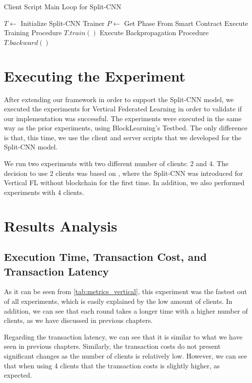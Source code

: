 \begin{algorithm}
\caption{Client Script Main Loop for Split-CNN}\label{alg:client_loop_splitcnn}
\begin{algorithmic}
\State $T \gets $ Initialize Split-CNN Trainer
    \State $P \gets$ Get Phase From Smart Contract
        \State Execute Training Procedure $T.train()$
        \State Execute Backpropagation Procedure $T.backward()$
    \EndIf
\EndWhile
\end{algorithmic}
\end{algorithm}

\section{Executing the Experiment}

After extending our framework in order to support the Split-CNN model, we executed the experiments for Vertical Federated Learning in order to validate if our implementation was successful. The experiments were executed in the same way as the prior experiments, using BlockLearning's Testbed. The only difference is that, this time, we use the client and server scripts that we developed for the Split-CNN model.

We run two experiments with two different number of clients: 2 and 4. The decision to use 2 clients was based on \cite{10.1145/3297858.3304038}, where the Split-CNN was introduced for Vertical FL without blockchain for the first time. In addition, we also performed experiments with 4 clients.

\section{Results Analysis}

\subsection{Execution Time, Transaction Cost, and Transaction Latency}

As it can be seen from \autoref{tab:metrics_vertical}, this experiment was the fastest out of all experiments, which is easily explained by the low amount of clients. In addition, we can see that each round takes a longer time with a higher number of clients, as we have discussed in previous chapters.

Regarding the transaction latency, we can see that it is similar to what we have seen in previous chapters. Similarly, the transaction costs do not present significant changes as the number of clients is relatively low. However, we can see that when using 4 clients that the transaction costs is slightly higher, as expected.


